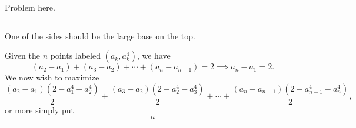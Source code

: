 \documentclass[11pt]{scrartcl}
\begin{document}
\begin{problem}
    Problem here.
\end{problem}

\vspace{-\baselineskip}\rule{\textwidth}{0.4pt}

One of the sides should be the large base on the top.

Given the $n$ points labeled $(a_{k}, a_{k}^{4})$, we have
\[(a_{2} - a_{1}) + (a_{3} - a_{2}) + \cdots + (a_{n} - a_{n - 1}) = 2 \implies a_{n} - a_{1} = 2.\]
We now wish to maximize
\[\frac{(a_{2} - a_{1})(2 - a_{1}^{4} - a_{2}^{4})}{2} + \frac{(a_{3} - a_{2})(2 - a_{2}^{4} - a_{3}^{4})}{2} + \cdots + \frac{(a_{n} - a_{n - 1})(2 - a_{n - 1}^{4} - a_{n}^{4})}{2},\]
or more simply put
\[\frac{a_{}}{}\]
\end{document}
